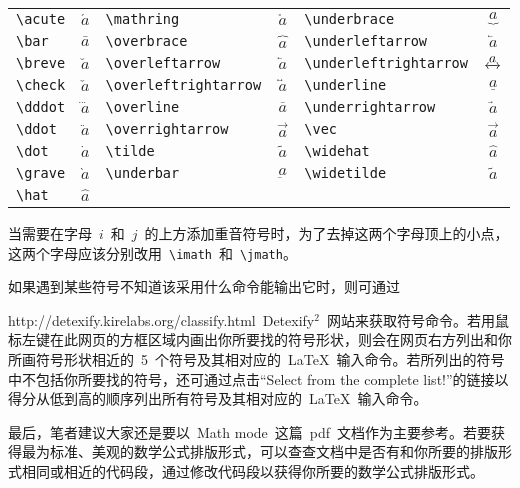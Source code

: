 \vspace{0.5em}\noindent{}\begin{tabularx}{\textwidth}{Xc|Xc|Xc}
 \verb|\acute| & $\acute{a}$ & \verb|\mathring| & $\mathring{a}$ & \verb|\underbrace| & $\underbrace{a}$ \\
 \verb|\bar| & $\bar{a}$ & \verb|\overbrace| & $\overbrace{a}$ & \verb|\underleftarrow| & $\underleftarrow{a}$ \\
 \verb|\breve| & $\breve{a}$ & \verb|\overleftarrow| & $\overleftarrow{a}$ & \verb|\underleftrightarrow| & $\underleftrightarrow{a}$ \\
 \verb|\check| & $\check{a}$ & \verb|\overleftrightarrow| & $\overleftrightarrow{a}$ & \verb|\underline| & $\underline{a}$ \\
 \verb|\dddot| & $\dddot{a}$ & \verb|\overline| & $\overline{a}$ & \verb|\underrightarrow| & $\underrightarrow{a}$ \\
 \verb|\ddot| & $\ddot{a}$ & \verb|\overrightarrow| & $\overrightarrow{a}$ & \verb|\vec| & $\vec{a}$ \\
 \verb|\dot| & $\dot{a}$ & \verb|\tilde| & $\tilde{a}$ & \verb|\widehat| & $\widehat{a}$ \\
 \verb|\grave| & $\grave{a}$ & \verb|\underbar| & $\underbar{a}$ & \verb|\widetilde| & $\widetilde{a}$ \\
 \verb|\hat| & $\hat{a}$ 
\end{tabularx}\vspace{0.5em}
 当需要在字母~$i$~和~$j$~的上方添加重音符号时，为了去掉这两个字母顶上的小点，这两个字母应该分别改用~\verb|\imath|~和~\verb|\jmath|。

如果遇到某些符号不知道该采用什么命令能输出它时，则可通过

http://detexify.kirelabs.org/classify.html~\pozhehao Detexify$^2$~网站来获取符号命令。若用鼠标左键在此网页的方框区域内画出你所要找的符号形状，则会在网页右方列出和你所画符号形状相近的~5~个符号及其相对应的~\LaTeX~输入命令。若所列出的符号中不包括你所要找的符号，还可通过点击“Select from the complete list!”的链接以得分从低到高的顺序列出所有符号及其相对应的~\LaTeX~输入命令。

最后，笔者建议大家还是要以~Math mode~这篇~pdf~文档作为主要参考。若要获得最为标准、美观的数学公式排版形式，可以查查文档中是否有和你所要的排版形式相同或相近的代码段，通过修改代码段以获得你所要的数学公式排版形式。